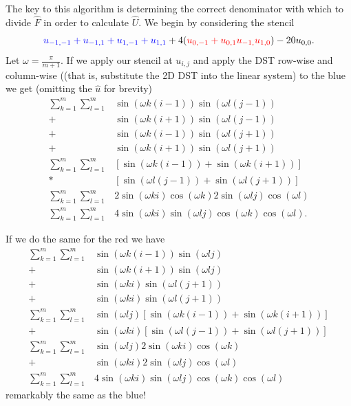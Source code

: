 \documentclass[12pt]{article}
\begin{document}
The key to this algorithm is determining the correct denominator with which to divide $\hat{F}$ in order to calculate $\hat{U}$. We begin by considering the stencil
$$
{\color{blue}u_{-1,-1}+u_{-1,1}+u_{1,-1}+u_{1,1}}+ 4({\color{red}u_{0,-1}+u_{0,1}u_{-1,}u_{1,0}}) - 20 u_{0,0}.
$$
Let $\omega = \frac{\pi}{m+1}$. If we apply our stencil at $u_{i,j}$ and apply the DST row-wise and column-wise ((that is, substitute the 2D DST into the linear system) to the {\color{blue}blue} we get (omitting the $\hat{u}$ for brevity)
\begin{align*}
\sum_{k=1}^m\sum_{l=1}^m & \sin(\omega k(i-1))\sin(\omega l(j-1)) \\
					   + & \sin(\omega k(i+1))\sin(\omega l(j-1)) \\
					   + & \sin(\omega k(i-1))\sin(\omega l(j+1)) \\
					   + & \sin(\omega k(i+1))\sin(\omega l(j+1)) \\
\sum_{k=1}^m\sum_{l=1}^m & \left[ \sin(\omega k(i-1)) + \sin(\omega k(i+1)) \right]\\
					   * & \left[ \sin(\omega l(j-1)) + \sin(\omega l(j+1)) \right]\\
\sum_{k=1}^m\sum_{l=1}^m & 2\sin(\omega ki)\cos(\omega k)2\sin(\omega lj)\cos(\omega l) \\
\sum_{k=1}^m\sum_{l=1}^m & 4\sin(\omega ki)\sin(\omega lj) \cos(\omega k)\cos(\omega l).
\end{align*}

If we do the same for the {\color{red}red} we have
\begin{align*}
\sum_{k=1}^m\sum_{l=1}^m & \sin(\omega k(i-1))\sin(\omega lj) \\
					   + & \sin(\omega k(i+1))\sin(\omega lj) \\
					   + & \sin(\omega ki)\sin(\omega l(j+1)) \\
					   + & \sin(\omega ki)\sin(\omega l(j+1)) \\
\sum_{k=1}^m\sum_{l=1}^m & \sin(\omega lj) \left[ \sin(\omega k(i-1)) + \sin(\omega k(i+1)) \right]\\
					   + & \sin(\omega ki) \left[ \sin(\omega l(j-1)) + \sin(\omega l(j+1)) \right] \\
\sum_{k=1}^m\sum_{l=1}^m & \sin(\omega lj) 2\sin(\omega ki) \cos(\omega k) \\
                       + & \sin(\omega ki) 2\sin(\omega lj) \cos(\omega l) \\
\sum_{k=1}^m\sum_{l=1}^m & 4 \sin(\omega ki)\sin(\omega lj)\cos(\omega k)\cos(\omega l)       
\end{align*}
remarkably the same as the {\color{blue}blue}! \bigbreak
\end{document}
